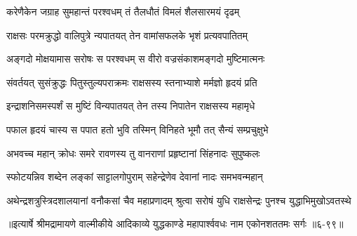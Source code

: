 \twolineshloka
{करेणैकेन जग्राह सुमहान्तं परश्वधम्}
{तं तैलधौतं विमलं शैलसारमयं दृढम्} %

\twolineshloka
{राक्षसः परमक्रुद्धो वालिपुत्रे न्यपातयत्}
{तेन वामांसफलके भृशं प्रत्यवपातितम्} %

\twolineshloka
{अङ्गदो मोक्षयामास सरोषः स परश्वधम्}
{स वीरो वज्रसंकाशमङ्गदो मुष्टिमात्मनः} %

\twolineshloka
{संवर्तयत् सुसंक्रुद्धः पितुस्तुल्यपराक्रमः}
{राक्षसस्य स्तनाभ्याशे मर्मज्ञो हृदयं प्रति} %

\twolineshloka
{इन्द्राशनिसमस्पर्शं स मुष्टिं विन्यपातयत्}
{तेन तस्य निपातेन राक्षसस्य महामृधे} %

\twolineshloka
{पफाल हृदयं चास्य स पपात हतो भुवि}
{तस्मिन् विनिहते भूमौ तत् सैन्यं सम्प्रचुक्षुभे} %

\twolineshloka
{अभवच्च महान् क्रोधः समरे रावणस्य तु}
{वानराणां प्रहृष्टानां सिंहनादः सुपुष्कलः} %

\twolineshloka
{स्फोटयन्निव शब्देन लङ्कां साट्टालगोपुराम्}
{सहेन्द्रेणेव देवानां नादः समभवन्महान्} %

\twolineshloka
{अथेन्द्रशत्रुस्त्रिदशालयानां वनौकसां चैव महाप्रणादम्}
{श्रुत्वा सरोषं युधि राक्षसेन्द्रः पुनश्च युद्धाभिमुखोऽवतस्थे} %


॥इत्यार्षे श्रीमद्रामायणे वाल्मीकीये आदिकाव्ये युद्धकाण्डे महापार्श्ववधः नाम एकोनशततमः सर्गः ॥६-९९॥
